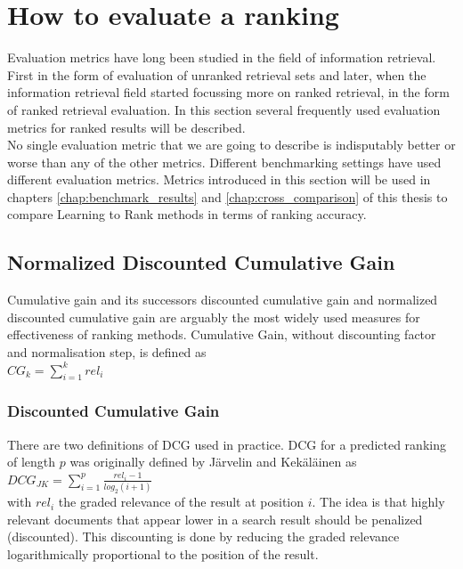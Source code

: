 \section{How to evaluate a ranking}
\label{sec:how_to_evaluate_a_ranking}
Evaluation metrics have long been studied in the field of information retrieval. First in the form of evaluation of unranked retrieval sets and later, when the information retrieval field started focussing more on ranked retrieval, in the form of ranked retrieval evaluation. In this section several frequently used evaluation metrics for ranked results will be described.\\

No single evaluation metric that we are going to describe is indisputably better or worse than any of the other metrics. Different benchmarking settings have used different evaluation metrics. Metrics introduced in this section will be used in chapters \ref{chap:benchmark_results} and \ref{chap:cross_comparison} of this thesis to compare Learning to Rank methods in terms of ranking accuracy.
\subsection{Normalized Discounted Cumulative Gain}
Cumulative gain and its successors discounted cumulative gain and normalized discounted cumulative gain are arguably the most widely used measures for effectiveness of ranking methods. Cumulative Gain, without discounting factor and normalisation step, is defined as\\

$CG_{k} = \sum\nolimits_{i=1}^k rel_i$

\subsubsection{Discounted Cumulative Gain}
There are two definitions of \ac{DCG} used in practice. \ac{DCG} for a predicted ranking of length $p$ was originally defined by J{\"a}rvelin and Kek{\"a}l{\"a}inen \cite{Jarvelin2002} as\\

$DCG_{JK} = \sum\nolimits_{i=1}^p \frac{rel_i-1}{log_2(i+1)}$\\

with $rel_i$ the graded relevance of the result at position $i$. The idea is that highly relevant documents that appear lower in a search result should be penalized (discounted). This discounting is done by reducing the graded relevance  logarithmically proportional to the position of the result.\\

